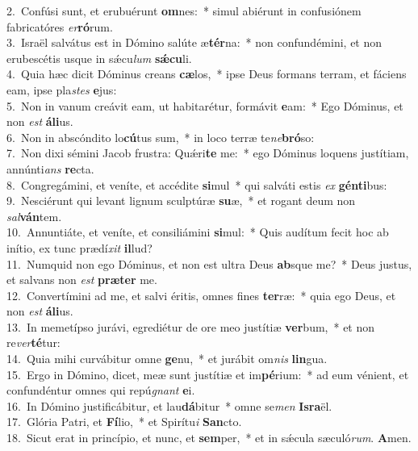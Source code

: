 {2.~}Confúsi sunt, et erubuérunt \textbf{om}nes:~* simul abiérunt in confusiónem fabricatóres \textit{er}\textbf{ró}rum.\\
{3.~}Israël salvátus est in Dómino salúte æ\textbf{tér}na:~* non confundémini, et non erubescétis usque in sǽcu\textit{lum} \textbf{sǽ}\textbf{cu}li.\\
{4.~}Quia hæc dicit Dóminus creans \textbf{cæ}los,~* ipse Deus formans terram, et fáciens eam, ipse pla\textit{stes} \textbf{e}jus:\\
{5.~}Non in vanum creávit eam, ut habitarétur, formávit \textbf{e}am:~* Ego Dóminus, et non \textit{est} \textbf{á}\textbf{li}us.\\
{6.~}Non in abscóndito lo\textbf{cú}tus sum,~* in loco terræ te\textit{ne}\textbf{bró}so:\\
{7.~}Non dixi sémini Jacob frustra: Quǽri\textbf{te} me:~* ego Dóminus loquens justítiam, annúnti\textit{ans} \textbf{re}cta.\\
{8.~}Congregámini, et veníte, et accédite \textbf{si}mul~* qui salváti estis \textit{ex} \textbf{gén}\textbf{ti}bus:\\
{9.~}Nesciérunt qui levant lignum sculptúræ \textbf{su}æ,~* et rogant deum non \textit{sal}\textbf{ván}tem.\\
{10.~}Annuntiáte, et veníte, et consiliámini \textbf{si}mul:~* Quis audítum fecit hoc ab inítio, ex tunc prædí\textit{xit} \textbf{il}lud?\\
{11.~}Numquid non ego Dóminus, et non est ultra Deus \textbf{ab}sque me?~* Deus justus, et salvans non \textit{est} \textbf{præ}\textbf{ter} me.\\
{12.~}Convertímini ad me, et salvi éritis, omnes fines \textbf{ter}ræ:~* quia ego Deus, et non \textit{est} \textbf{á}\textbf{li}us.\\
{13.~}In memetípso jurávi, egrediétur de ore meo justítiæ \textbf{ver}bum,~* et non re\textit{ver}\textbf{té}tur:\\
{14.~}Quia mihi curvábitur omne \textbf{ge}nu,~* et jurábit om\textit{nis} \textbf{lin}gua.\\
{15.~}Ergo in Dómino, dicet, meæ sunt justítiæ et im\textbf{pé}rium:~* ad eum vénient, et confundéntur omnes qui repú\textit{gnant} \textbf{e}i.\\
{16.~}In Dómino justificábitur, et lau\textbf{dá}bitur~* omne se\textit{men} \textbf{Is}\textbf{ra}ël.\\
{17.~}Glória Patri, et \textbf{Fí}lio,~* et Spirítu\textit{i} \textbf{San}cto.\\
{18.~}Sicut erat in princípio, et nunc, et \textbf{sem}per,~* et in sǽcula sæculó\textit{rum}. \textbf{A}men.\\
